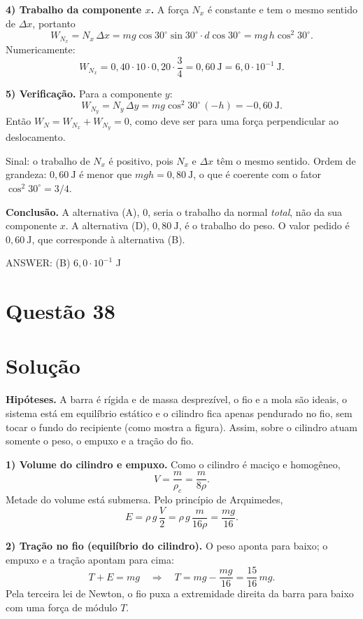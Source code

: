 \documentclass{article}%
\begin{document}
\textbf{4) Trabalho da componente $x$.} A força $N_x$ é constante e tem o mesmo sentido de $\Delta x$, portanto
\[
W_{N_x}=N_x\,\Delta x = mg\cos 30^\circ\sin 30^\circ\cdot d\cos 30^\circ = mg\,h\cos^2 30^\circ .
\]
Numericamente:
\[
W_{N_x}=0{,}40\cdot 10\cdot 0{,}20\cdot\frac{3}{4}=0{,}60\ \text{J}=6{,}0\cdot 10^{-1}\ \text{J}.
\]

\textbf{5) Verificação.} Para a componente $y$:
\[
W_{N_y}=N_y\,\Delta y=mg\cos^2 30^\circ\,(-h)=-0{,}60\ \text{J}.
\]
Então $W_N=W_{N_x}+W_{N_y}=0$, como deve ser para uma força perpendicular ao deslocamento.

Sinal: o trabalho de $N_x$ é positivo, pois $N_x$ e $\Delta x$ têm o mesmo sentido. Ordem de grandeza: $0{,}60\ \text{J}$ é menor que $mgh=0{,}80\ \text{J}$, o que é coerente com o fator $\cos^2 30^\circ=3/4$.

\textbf{Conclusão.} A alternativa (A), $0$, seria o trabalho da normal \emph{total}, não da sua componente $x$. A alternativa (D), $0{,}80\ \text{J}$, é o trabalho do peso. O valor pedido é $0{,}60\ \text{J}$, que corresponde à alternativa (B).

ANSWER: (B) $6{,}0\cdot 10^{-1}$ J%
\newpage%
\section*{Questão 38}

\section*{Solução}

\textbf{Hipóteses.} A barra é rígida e de massa desprezível, o fio e a mola são ideais, o sistema está em equilíbrio estático e o cilindro fica apenas pendurado no fio, sem tocar o fundo do recipiente (como mostra a figura). Assim, sobre o cilindro atuam somente o peso, o empuxo e a tração do fio.

\textbf{1) Volume do cilindro e empuxo.} Como o cilindro é maciço e homogêneo,
\[
V=\frac{m}{\rho_c}=\frac{m}{8\rho}.
\]
Metade do volume está submersa. Pelo princípio de Arquimedes,
\[
E=\rho\, g\,\frac{V}{2}=\rho\, g\,\frac{m}{16\rho}=\frac{mg}{16}.
\]

\textbf{2) Tração no fio (equilíbrio do cilindro).} O peso aponta para baixo; o empuxo e a tração apontam para cima:
\[
T+E=mg\quad\Longrightarrow\quad T=mg-\frac{mg}{16}=\frac{15}{16}\,mg .
\]
Pela terceira lei de Newton, o fio puxa a extremidade direita da barra para baixo com uma força de módulo $T$.
\end{document}
